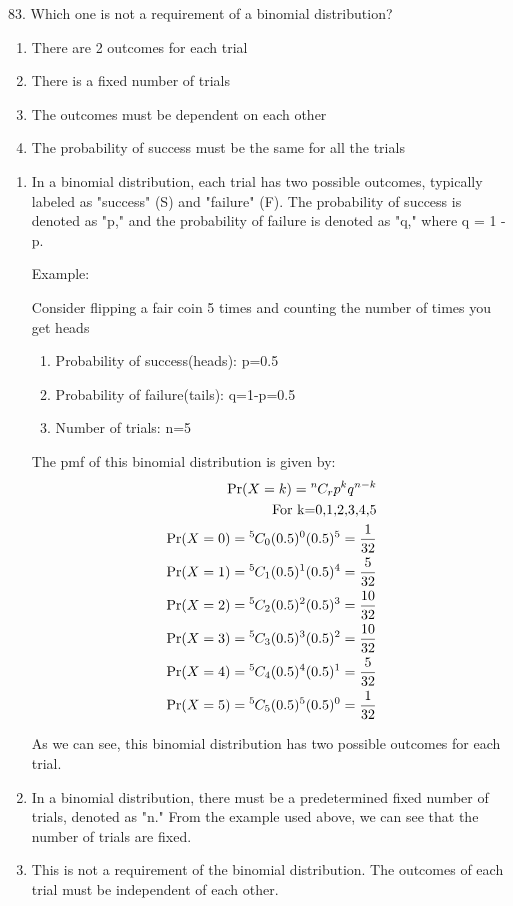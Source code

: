 \documentclass{article}[]
\begin{document}
83. Which one is not a requirement of a binomial distribution?
\begin{enumerate}
\item There are 2 outcomes for each trial
\item There is a fixed number of trials
\item The outcomes must be dependent on each other
\item The probability of success must be the same for all the trials
\end{enumerate}
\solution
\begin{enumerate}
\item
{
In a binomial distribution, each trial has two possible outcomes, typically labeled as "success" (S) and "failure" (F). The probability of success is denoted as "p," and the probability of failure is denoted as "q," where q = 1 - p.

Example:

Consider flipping a fair coin 5 times and counting the number of times you get heads
\begin{enumerate}
\item Probability of success(heads): p=0.5
\item Probability of failure(tails): q=1-p=0.5
\item Number of trials: n=5
\end{enumerate}
The pmf of this binomial distribution is given by:
\begin{align}
\Pr(X=k) = {{}^{n}\mkern-1muC_{r}} p^{k} q^{n-k} \\
\text{For k=0,1,2,3,4,5}\\
\Pr(X=0) = {{}^{5}\mkern-1muC_{0}} (0.5)^{0} (0.5)^{5} = \frac{1}{32}\\
\Pr(X=1) = {{}^{5}\mkern-1muC_{1}} (0.5)^{1} (0.5)^{4} = \frac{5}{32}\\
\Pr(X=2) = {{}^{5}\mkern-1muC_{2}} (0.5)^{2} (0.5)^{3} = \frac{10}{32}\\
\Pr(X=3) = {{}^{5}\mkern-1muC_{3}} (0.5)^{3} (0.5)^{2} = \frac{10}{32}\\
\Pr(X=4) = {{}^{5}\mkern-1muC_{4}} (0.5)^{4} (0.5)^{1} = \frac{5}{32}\\
\Pr(X=5) = {{}^{5}\mkern-1muC_{5}} (0.5)^{5} (0.5)^{0} = \frac{1}{32}
\end{align}

As we can see, this binomial distribution has two possible outcomes for each trial.
}
\item
{
In a binomial distribution, there must be a predetermined fixed number of trials, denoted as "n."
From the example used above, we can see that the number of trials are fixed.
}
\item
{
This is not a requirement of the binomial distribution. The outcomes of each trial must be independent of each other.

}
\end{enumerate}
\end{document}
